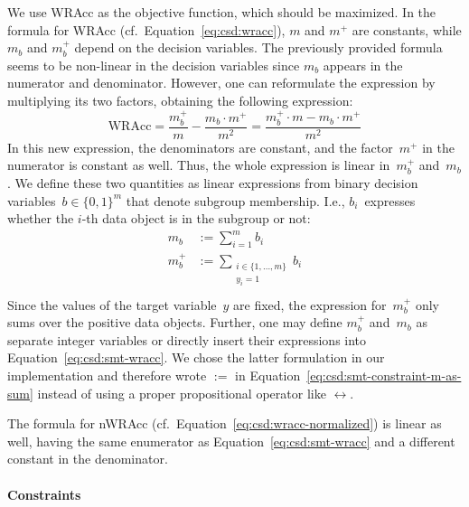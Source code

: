 \documentclass{article}
\theoremstyle{definition}
\begin{document}
We use WRAcc as the objective function, which should be maximized.
In the formula for WRAcc (cf.~Equation~\ref{eq:csd:wracc}), $m$ and $m^+$ are constants, while $m_b$ and $m_b^+$ depend on the decision variables.
The previously provided formula seems to be non-linear in the decision variables since $m_b$ appears in the numerator and denominator.
However, one can reformulate the expression by multiplying its two factors, obtaining the following expression:
%
\begin{equation}
	\text{WRAcc} = \frac{m_b^+}{m} - \frac{m_b \cdot m^+}{m^2} = \frac{m_b^+ \cdot m - m_b \cdot m^+}{m^2}
	\label{eq:csd:smt-wracc}
\end{equation}
%
In this new expression, the denominators are constant, and the factor~$m^+$ in the numerator is constant as well.
Thus, the whole expression is linear in~$m_b^+$ and~$m_b$.
We define these two quantities as linear expressions from binary decision variables~$b \in \{0, 1\}^m$ that denote subgroup membership.
I.e., $b_i$~expresses whether the $i$-th data object is in the subgroup or not:
%
\begin{equation}
	\begin{aligned}
		 m_b &:= \sum_{i=1}^{m} b_i \\
		 m_b^+ &:= \sum_{\substack{i \in \{1, \dots, m\} \\ y_i = 1 }} b_i \\
	\end{aligned}
	\label{eq:csd:smt-constraint-m-as-sum}
\end{equation}
%
Since the values of the target variable~$y$ are fixed, the expression for~$m_b^+$ only sums over the positive data objects.
Further, one may define $m_b^+$ and~$m_b$ as separate integer variables or directly insert their expressions into Equation~\ref{eq:csd:smt-wracc}.
We chose the latter formulation in our implementation and therefore wrote $:=$ in Equation~\ref{eq:csd:smt-constraint-m-as-sum} instead of using a proper propositional operator like $\leftrightarrow$.

The formula for nWRAcc (cf.~Equation~\ref{eq:csd:wracc-normalized}) is linear as well, having the same enumerator as Equation~\ref{eq:csd:smt-wracc} and a different constant in the denominator.

\paragraph{Constraints}
\end{document}
